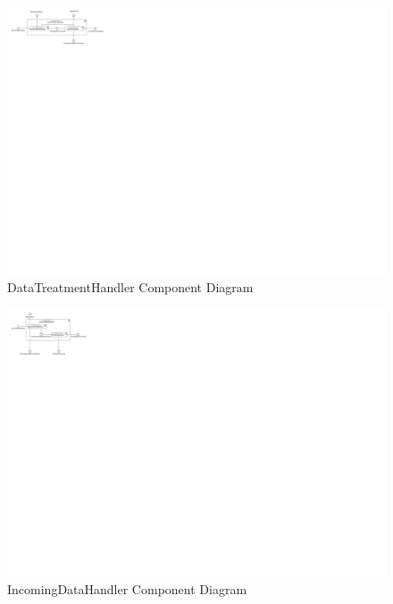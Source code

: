 \begin{figure}[!htp]
  \centering
  \includegraphics[width=\maxwidth{\textwidth}]{appendices/architecture/images/ComponentDiagram-DataTreatmentHandler-Component-Diagram.pdf}
  \caption[DataTreatmentHandler Component Diagram]{DataTreatmentHandler Component Diagram \label{diag:Component:DataTreatmentHandlerComponentDiagram}}
\end{figure}


\begin{figure}[!htp]
  \centering
  \includegraphics[width=\maxwidth{\textwidth}]{appendices/architecture/images/ComponentDiagram-IncomingDataHandler-Component-Diagram.pdf}
  \caption[IncomingDataHandler Component Diagram]{IncomingDataHandler Component Diagram \label{diag:Component:IncomingDataHandlerComponentDiagram}}
\end{figure}

